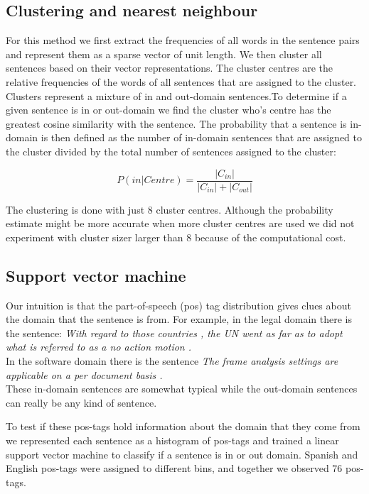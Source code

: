 \documentclass[11pt]{article}
\begin{document}
\subsection{Clustering and nearest neighbour}
For this method we first extract the frequencies of all words in the sentence pairs and represent them as a sparse vector of unit length. We then cluster all sentences based on their vector representations. The cluster centres are the relative frequencies of the words of all sentences that are assigned to the cluster. Clusters represent a mixture of in and out-domain sentences.To determine if a given sentence is in or out-domain we find the cluster who's centre has the greatest cosine similarity with the sentence. The probability that a sentence is in-domain is then defined as the number of in-domain sentences that are assigned to the cluster divided by the total number of sentences assigned to the cluster:

$$ P(in|C{entre}) = \frac{|C_{in}|}{|C_{in}| + |C_{out}|} $$

The clustering is done with just 8 cluster centres. Although the probability estimate might be more accurate when more cluster centres are used we did not experiment with cluster sizer larger than 8 because of the computational cost.

\subsection{Support vector machine}
Our intuition is that the part-of-speech (pos) tag distribution gives clues about the domain that the sentence is from. For example, in the legal domain there is the sentence:
\textit{With regard to those countries , the UN went as far as to adopt what is referred to as a no action motion .}\\
In the software domain there is the sentence \textit{The frame analysis settings are applicable on a per document basis .}\\
These in-domain sentences are somewhat typical while the out-domain sentences can really be any kind of sentence.

To test if these pos-tags hold information about the domain that they come from we represented each sentence as a histogram of pos-tags and trained a linear support vector machine to classify if a sentence is in or out domain. Spanish and English pos-tags were assigned to different bins, and together we observed $76$ pos-tags.
\end{document}

